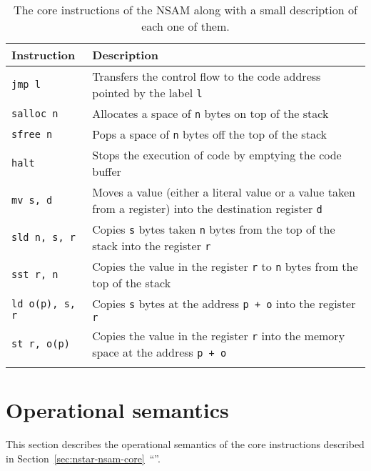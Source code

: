 \begin{longtable}[H]{p{}p{}}
  \toprule
  Instruction & Description \\
  \midrule \endhead
  \texttt{jmp l} & Transfers the control flow to the code address pointed by the label \texttt{l} \\
  \texttt{salloc n} & Allocates a space of \texttt{n} bytes on top of the stack \\
  \texttt{sfree n} & Pops a space of \texttt{n} bytes off the top of the stack \\
  \texttt{halt} & Stops the execution of code by emptying the code buffer \\
  \texttt{mv s, d} & Moves a value (either a literal value or a value taken from a register) into the destination register \texttt{d} \\
  \texttt{sld n, s, r} & Copies \texttt{s} bytes taken \texttt{n} bytes from the top of the stack into the register \texttt{r} \\
  \texttt{sst r, n} & Copies the value in the register \texttt{r} to \texttt{n} bytes from the top of the stack \\
  \texttt{ld o(p), s, r} & Copies \texttt{s} bytes at the address \texttt{p + o} into the register \texttt{r} \\
  \texttt{st r, o(p)} & Copies the value in the register \texttt{r} into the memory space at the address \texttt{p + o} \\
  \bottomrule

  \caption{The core instructions of the NSAM along with a small description of each one of them.}
  \label{fig:nstar-nsam-core-instructions}
\end{longtable}

\section{Operational semantics}\label{sec:nstar-nsam-opsem}

This section describes the operational semantics of the core instructions described in Section~\ref{sec:nstar-nsam-core}~``''.


